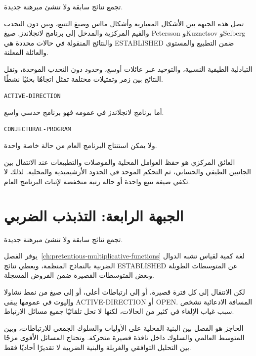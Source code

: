 \begin{remark}
\label{map:ch26-l-functions-spectrum}
\noindent{}\quad تجمع نتائج سابقة ولا تنشئ مبرهنة جديدة.\par
{}
تصل هذه الجبهة بين الأشكال المعيارية وأشكال مااس وصيغ التتبع، وبين دون التحدب والقيم المركزية والمدخل إلى برنامج لانجلاندز. صيغ Petersson وKuznetsov وSelberg والنتائج المنقولة في حالات محددة هي \textenglish{ESTABLISHED} ضمن التطبيع والمستوى والعائلة المعلنة.

التبادلية الطيفية النسبية، والتوحيد عبر عائلات أوسع، وحدود دون التحدب الموحدة، ونقل النتائج بين زمر وتمثيلات مختلفة تمثل اتجاهًا بحثيًا نشطًا.

\begin{center}
\small\textenglish{\texttt{ACTIVE-DIRECTION}}
\end{center}

أما برنامج لانجلاندز في عمومه فهو برنامج حدسي واسع.

\begin{center}
\small\textenglish{\texttt{CONJECTURAL-PROGRAM}}
\end{center}

ولا يمكن استنتاج البرنامج العام من حالة خاصة واحدة.

العائق المركزي هو حفظ العوامل المحلية والموصلات والتطبيعات عند الانتقال بين الجانبين الطيفي والحسابي، ثم التحكم الموحد في الحدود الأرشيميدية والمحلية. لذلك لا تكفي صيغة تتبع واحدة أو حالة رتبة منخفضة لإثبات البرنامج العام.
\end{remark}

\section{الجبهة الرابعة: التذبذب الضربي}

\begin{remark}
\label{map:ch26-multiplicative-oscillation}
\noindent{}\quad تجمع نتائج سابقة ولا تنشئ مبرهنة جديدة.\par
يوفر الفصل~\ref{ch:pretentious-multiplicative-functions} لغة كمية لقياس تشبه الدوال الضربية بالنماذج المنظمة، ويعطي نتائج \textenglish{ESTABLISHED} عن المتوسطات الطويلة وبعض المتوسطات القصيرة ضمن الفروض المسجلة.

لكن الانتقال إلى كل فترة قصيرة، أو إلى ارتباطات أعلى، أو إلى صيغ من نمط تشاولا وإليوت في عمومها يبقى \textenglish{ACTIVE-DIRECTION} أو \textenglish{OPEN}. المسافة الادعائية تشخص سبب غياب الإلغاء في كثير من الحالات، لكنها لا تحل تلقائيًا جميع مسائل الارتباط.

الحاجز هو الفصل بين البنية المحلية على الأوليات والسلوك الجمعي للارتباطات، وبين المتوسط العالمي والسلوك داخل نافذة قصيرة متحركة. وتحتاج المسائل الأقوى مزجًا بين التحليل التوافقي والغربلة والبنية الضربية لا تقديرًا أحاديًا فقط.
\end{remark}

